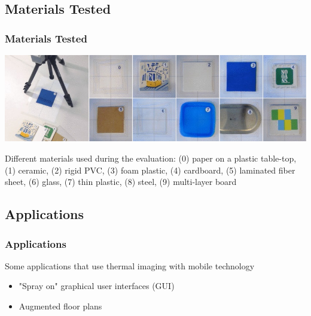 \documentclass{beamer}
\begin{document}
\subsection{Materials Tested}
\begin{frame}	
\frametitle{Materials Tested}
\includegraphics[width=\textwidth]{../Sample_paper/images/ThermalTesting}

Different materials used during the evaluation: (0) paper on a plastic table-top, (1) ceramic, (2) rigid PVC, (3) foam plastic, (4) cardboard, (5) laminated fiber sheet, (6) glass, (7) thin plastic, (8) steel, (9) multi-layer board
\begin{center}
	\cite{Thermal}
	\end{center}
\end{frame}


\subsection{Applications}

\begin{frame}
	\frametitle{Applications}
	Some applications that use thermal imaging with mobile technology 
	\begin{itemize}
		\item "Spray on" graphical user interfaces (GUI)
		\item Augmented floor plans
	\end{itemize}
\end{frame}
\end{document}
